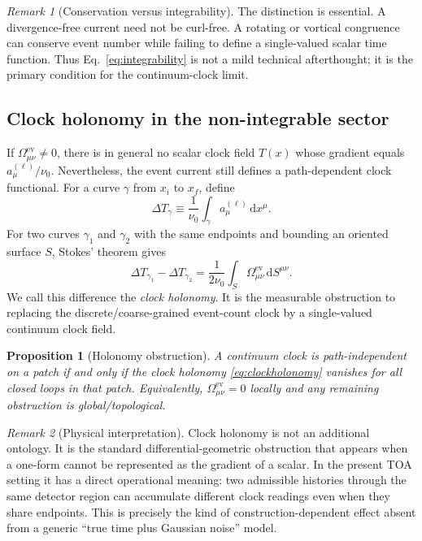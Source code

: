 \documentclass[11pt, a4paper]{article}
\theoremstyle{definition}
\theoremstyle{plain}
\newtheorem{proposition}{Proposition}[section]
\theoremstyle{remark}
\newtheorem{remark}{Remark}[section]
\numberwithin{equation}{section}
\newcommand{\dd}{\mathrm{d}}
\begin{document}
    \begin{remark}[Conservation versus integrability]
        The distinction is essential. A divergence-free current need not be curl-free. A rotating or vortical congruence can conserve event number while failing to define a single-valued scalar time function. Thus Eq.~\eqref{eq:integrability} is not a mild technical afterthought; it is the primary condition for the continuum-clock limit.
    \end{remark}
    
    \subsection{Clock holonomy in the non-integrable sector}
    
    If $\Omega^{\mathrm{ev}}_{\mu\nu}\neq0$, there is in general no scalar clock field $T(x)$ whose gradient equals $a^{(\ell)}_\mu/\nu_0$. Nevertheless, the event current still defines a path-dependent clock functional. For a curve $\gamma$ from $x_i$ to $x_f$, define
    \begin{equation}
        \Delta T_\gamma
        \equiv
        \frac{1}{\nu_0}\int_\gamma a^{(\ell)}_\mu\,\dd x^\mu .
        \label{eq:pathclock}
    \end{equation}
    For two curves $\gamma_1$ and $\gamma_2$ with the same endpoints and bounding an oriented surface $S$, Stokes' theorem gives
    \begin{equation}
        \Delta T_{\gamma_1}-\Delta T_{\gamma_2}
        =
        \frac{1}{2\nu_0}
        \int_S
        \Omega^{\mathrm{ev}}_{\mu\nu}\,\dd S^{\mu\nu} .
        \label{eq:clockholonomy}
    \end{equation}
    We call this difference the \emph{clock holonomy}. It is the measurable obstruction to replacing the discrete/coarse-grained event-count clock by a single-valued continuum clock field.
    
    \begin{proposition}[Holonomy obstruction]
        A continuum clock is path-independent on a patch if and only if the clock holonomy \eqref{eq:clockholonomy} vanishes for all closed loops in that patch. Equivalently, $\Omega^{\mathrm{ev}}_{\mu\nu}=0$ locally and any remaining obstruction is global/topological.
    \end{proposition}
    
    \begin{remark}[Physical interpretation]
        Clock holonomy is not an additional ontology. It is the standard differential-geometric obstruction that appears when a one-form cannot be represented as the gradient of a scalar. In the present TOA setting it has a direct operational meaning: two admissible histories through the same detector region can accumulate different clock readings even when they share endpoints. This is precisely the kind of construction-dependent effect absent from a generic ``true time plus Gaussian noise'' model.
    \end{remark}
    
\end{document}
